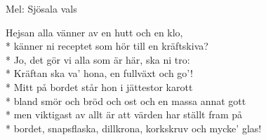 \begin{SongText}
    \begin{SongInfo}
        Mel: Sjösala vals
    \end{SongInfo}
    \begin{SongVerse}
        Hejsan alla vänner av en hutt och en klo,\\*%
        känner ni receptet som hör till en kräftskiva?\\*%
        Jo, det gör vi alla som är här, ska ni tro:\\*%
        Kräftan ska va’ hona, en fullväxt och go’!\\*%
        Mitt på bordet står hon i jättestor karott\\*%
        bland smör och bröd och ost och en massa annat gott\\*%
        men viktigast av allt är att värden har ställt fram på\\*%
        bordet, snapsflaska, dillkrona, korkskruv och mycke’ glas!
    \end{SongVerse}
\end{SongText}
\newpage